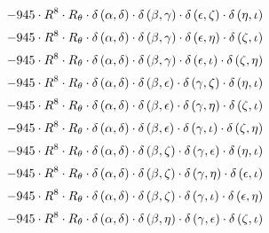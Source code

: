 \begin{subequations}
\begin{gather}
 \\[0.2em] \notag 		 - 945 \cdot R^{8} \cdot R_{\theta{}} \cdot \delta{}\left(\alpha{}, \delta{}\right) \cdot \delta{}\left(\beta{}, \gamma{}\right) \cdot \delta{}\left(\epsilon{}, \zeta{}\right) \cdot \delta{}\left(\eta{}, \iota{}\right) 
 \\[0.2em] \notag 		 - 945 \cdot R^{8} \cdot R_{\theta{}} \cdot \delta{}\left(\alpha{}, \delta{}\right) \cdot \delta{}\left(\beta{}, \gamma{}\right) \cdot \delta{}\left(\epsilon{}, \eta{}\right) \cdot \delta{}\left(\zeta{}, \iota{}\right) 
 \\[0.2em] \notag 		 - 945 \cdot R^{8} \cdot R_{\theta{}} \cdot \delta{}\left(\alpha{}, \delta{}\right) \cdot \delta{}\left(\beta{}, \gamma{}\right) \cdot \delta{}\left(\epsilon{}, \iota{}\right) \cdot \delta{}\left(\zeta{}, \eta{}\right) 
 \\[0.2em] \notag 		 - 945 \cdot R^{8} \cdot R_{\theta{}} \cdot \delta{}\left(\alpha{}, \delta{}\right) \cdot \delta{}\left(\beta{}, \epsilon{}\right) \cdot \delta{}\left(\gamma{}, \zeta{}\right) \cdot \delta{}\left(\eta{}, \iota{}\right) 
 \\[0.2em] \notag 		 - 945 \cdot R^{8} \cdot R_{\theta{}} \cdot \delta{}\left(\alpha{}, \delta{}\right) \cdot \delta{}\left(\beta{}, \epsilon{}\right) \cdot \delta{}\left(\gamma{}, \eta{}\right) \cdot \delta{}\left(\zeta{}, \iota{}\right) 
 \\[0.2em] \notag 		 - 945 \cdot R^{8} \cdot R_{\theta{}} \cdot \delta{}\left(\alpha{}, \delta{}\right) \cdot \delta{}\left(\beta{}, \epsilon{}\right) \cdot \delta{}\left(\gamma{}, \iota{}\right) \cdot \delta{}\left(\zeta{}, \eta{}\right) 
 \\[0.2em] \notag 		 - 945 \cdot R^{8} \cdot R_{\theta{}} \cdot \delta{}\left(\alpha{}, \delta{}\right) \cdot \delta{}\left(\beta{}, \zeta{}\right) \cdot \delta{}\left(\gamma{}, \epsilon{}\right) \cdot \delta{}\left(\eta{}, \iota{}\right) 
 \\[0.2em] \notag 		 - 945 \cdot R^{8} \cdot R_{\theta{}} \cdot \delta{}\left(\alpha{}, \delta{}\right) \cdot \delta{}\left(\beta{}, \zeta{}\right) \cdot \delta{}\left(\gamma{}, \eta{}\right) \cdot \delta{}\left(\epsilon{}, \iota{}\right) 
 \\[0.2em] \notag 		 - 945 \cdot R^{8} \cdot R_{\theta{}} \cdot \delta{}\left(\alpha{}, \delta{}\right) \cdot \delta{}\left(\beta{}, \zeta{}\right) \cdot \delta{}\left(\gamma{}, \iota{}\right) \cdot \delta{}\left(\epsilon{}, \eta{}\right) 
 \\[0.2em] \notag 		 - 945 \cdot R^{8} \cdot R_{\theta{}} \cdot \delta{}\left(\alpha{}, \delta{}\right) \cdot \delta{}\left(\beta{}, \eta{}\right) \cdot \delta{}\left(\gamma{}, \epsilon{}\right) \cdot \delta{}\left(\zeta{}, \iota{}\right) 

\end{gather}
\end{subequations}
